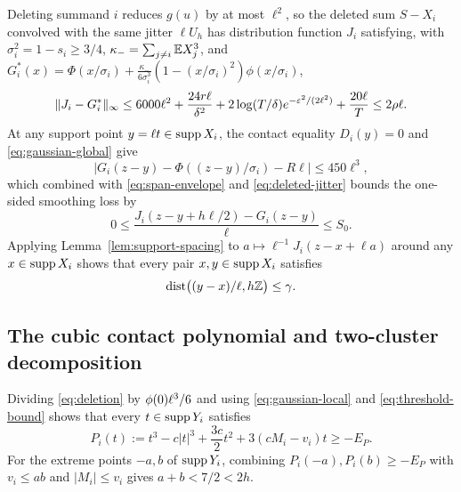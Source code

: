 Deleting summand $i$ reduces $g(u)$ by at most $\ell^2$, so the deleted
sum $S-X_i$ convolved with the same jitter $\ell U_h$ has distribution
function $J_i$ satisfying, with $\sigma_i^2=1-s_i\ge3/4$,
$\kappa_-=\sum_{j\ne i}\mathbb E X_j^3$, and
$G_i^*(x)=\Phi(x/\sigma_i)+\frac{\kappa_-}{6\sigma_i^3}(1-(x/\sigma_i)^2)\phi(x/\sigma_i)$,
\begin{equation}\label{eq:deleted-jitter}
 \|J_i-G_i^*\|_\infty
 \le6000\ell^2+\frac{24r\ell}{\delta^2}
       +2\log(T/\delta)e^{-\varepsilon^2/(2\ell^2)}+\frac{20\ell}{T}
 \le2\rho\ell.
\end{equation}
At any support point $y=\ell t\in\operatorname{supp} X_i$, the contact equality $D_i(y)=0$
and \eqref{eq:gaussian-global} give
\begin{equation}\label{eq:contact-flat}
 |G_i(z-y)-\Phi((z-y)/\sigma_i)-R\ell|\le450\ell^3,
\end{equation}
which combined with \eqref{eq:span-envelope} and \eqref{eq:deleted-jitter}
bounds the one-sided smoothing loss by
\begin{equation}\label{eq:smoothing-loss}
 0\le\frac{J_i(z-y+h\ell/2)-G_i(z-y)}{\ell}\le S_0.
\end{equation}
Applying Lemma~\ref{lem:support-spacing} to $a\mapsto\ell^{-1}J_i(z-x+\ell a)$
around any $x\in\operatorname{supp} X_i$ shows that every pair $x,y\in\operatorname{supp} X_i$ satisfies
\begin{equation}\label{eq:arithmetic-spacing}
                   \operatorname{dist}\bigl((y-x)/\ell,h\mathbb Z\bigr)\le\gamma.
\end{equation}

\subsection{The cubic contact polynomial and two-cluster decomposition}

Dividing \eqref{eq:deletion} by $\phi(0)\ell^3/6$ and using \eqref{eq:gaussian-local}
and \eqref{eq:threshold-bound} shows that every $t\in\operatorname{supp} Y_i$ satisfies
\begin{equation}\label{eq:support-polynomial}
 P_i(t):=t^3-c|t|^3+\frac{3c}{2}t^2+3(cM_i-v_i)t\ge-E_P.
\end{equation}
For the extreme points $-a,b$ of $\operatorname{supp} Y_i$, combining $P_i(-a),P_i(b)\ge-E_P$
with $v_i\le ab$ and $|M_i|\le v_i$ gives $a+b<7/2<2h$.

